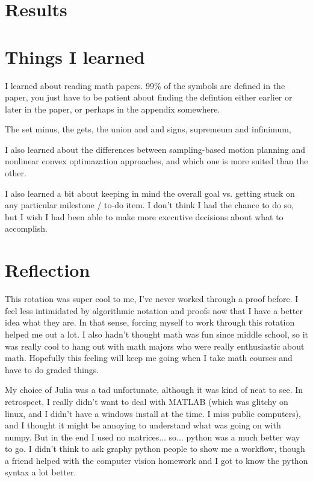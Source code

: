 \documentclass[a4paper]{article}
\begin{document}
{\section{Results}


\section{Things I learned}

I learned about reading math papers. 99\% of the symbols are defined in the
paper, you just have to be patient about finding the defintion either earlier or later in
the paper, or perhaps in the appendix somewhere.

The set minus, the gets, the union and and signs, supremeum and infinimum, 


I also learned about the differences between sampling-based motion planning and
nonlinear convex optimazation approaches, and which one is more suited than the
other.

I also learned a bit about keeping in mind the overall goal vs. getting stuck on
any particular milestone / to-do item. I don't think I had the chance to do so,
but I wish I had been able to make more executive decisions about what to
accomplish. 

\section{Reflection}

This rotation was super cool to me, I've never worked through a proof before. I
feel less intimidated by algorithmic notation and proofs now that I have a
better idea what they are. In that sense, forcing myself to work through this
rotation helped me out a lot. I also hadn't thought math was fun since middle
school, so it was really cool to hang out with math majors who were really
enthusiastic about math. Hopefully this feeling will keep me going when I take
math courses and have to do graded things.

My choice of Julia was a tad unfortunate, although it was kind of neat to see.
In retrospect, I really didn't want to deal with MATLAB (which was glitchy on
linux, and I didn't have a windows install at the time. I miss public
computers), and I thought it might be annoying to understand what was going on
with numpy. But in the end I used no matrices... so... python was a much better
way to go. I didn't think to ask graphy python people to show me a workflow,
though a friend helped with the computer vision homework and I got to know the
python syntax a lot better.

}
\end{document}

